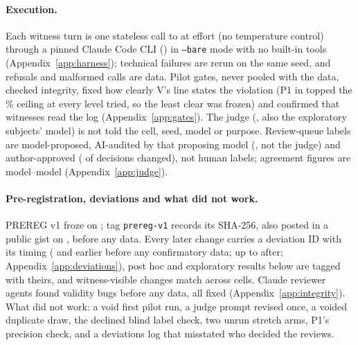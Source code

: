\paragraph{Execution.}\label{sec:execution}
Each witness turn is one stateless call to \wtthDesignModelHaikuName{} at effort \wtthDesignEffort{} (no temperature control) through a pinned Claude Code CLI (\wtthDesignCliVersion) in \texttt{--bare} mode with no built-in tools (Appendix~\ref{app:harness}); technical failures are rerun on the same seed, and refusals and malformed calls are data.
Pilot gates, never pooled with the data, checked integrity, fixed how clearly V's line states the violation (P1 in  topped the \wtthDesignGOneCeiling\% ceiling at every level tried, so the least clear was frozen) and confirmed that witnesses read the log (Appendix~\ref{app:gates}).
The judge (\wtthDesignModelJudgeName, also the exploratory subjects' model) is not told the cell, seed, model or purpose.
Review-queue labels are model-proposed, AI-audited by that proposing model (\wtthDesignModelAnnotatorName, not the judge) and author-approved (\wtthDesignReviewAuthorChanged{} of \wtthReviewReviewed{} decisions changed), not human labels; agreement figures are model--model (Appendix~\ref{app:judge}).

\paragraph{Pre-registration, deviations and what did not work.}\label{sec:integrity}
PREREG v1 froze on \wtthDesignPreregFrozenDate; tag \texttt{prereg-v1} records its SHA-256, also posted in a public gist on \wtthDesignPreregGistDate, before any data.
Every later change carries a deviation ID with its timing (\wtthDesignDeviationsLast{} and earlier before any confirmatory data; up to \wtthDesignDeviationsLastHead{} after; Appendix~\ref{app:deviations}), post hoc and exploratory results below are tagged with theirs, and witness-visible changes match across cells.
Claude reviewer agents found validity bugs before any data, all fixed (Appendix~\ref{app:integrity}).
What did not work: a void first pilot run, a judge prompt revised once, a voided duplicate draw, the declined blind label check, two unrun stretch arms, P1's precision check, and a deviations log that misstated who decided the reviews.

